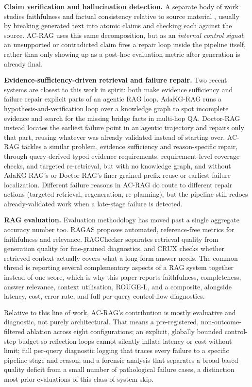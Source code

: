 \documentclass[conference]{IEEEtran}
\begin{document}
\textbf{Claim verification and hallucination detection.} A separate body of work
studies faithfulness and factual consistency relative to source material
\cite{maynez2020faithfulness,kryscinski2020factcc,pagnoni2021frank}, usually by
breaking generated text into atomic claims and checking each against the source.
AC-RAG uses this same decomposition, but as an \emph{internal control signal}: an
unsupported or contradicted claim fires a repair loop inside the pipeline itself,
rather than only showing up as a post-hoc evaluation metric after generation is
already final.

\textbf{Evidence-sufficiency-driven retrieval and failure repair.} Two recent systems
are closest to this work in spirit: both make evidence sufficiency and failure repair
explicit parts of an agentic RAG loop. AdaKG-RAG \cite{yuan2026adakg} runs a
hypothesis-and-verification loop over a knowledge graph to spot incomplete evidence and
search for the missing bridge facts in multi-hop QA. Doctor-RAG \cite{jiao2026doctorrag}
instead locates the earliest failure point in an agentic trajectory and repairs only
that part, reusing whatever was already validated instead of starting over. AC-RAG
tackles a similar problem, evidence sufficiency and reason-specific repair, through
query-derived typed evidence requirements, requirement-level coverage checks, and
targeted re-retrieval, but with no knowledge graph, and without AdaKG-RAG's or
Doctor-RAG's finer-grained prefix reuse or earliest-failure localization. Different
failure reasons in AC-RAG do route to different repair actions (targeted retrieval,
regeneration, re-planning), but the pipeline still redoes already-validated work when a
late-stage failure is detected.

\textbf{RAG evaluation.} Evaluation methodology has moved past a single aggregate
accuracy number too. RAGAS \cite{es2024ragas} proposes automated, reference-free
metrics for faithfulness and relevance. RAGChecker \cite{ru2024ragchecker} separates
retrieval quality from generation quality for fine-grained diagnostics, and CRUX
\cite{ju2025crux} checks whether retrieved context actually covers what a long-form
answer needs. The common thread is reporting several complementary aspects of a RAG
system together instead of one score, which is why this paper reports faithfulness,
completeness, answer relevance, context utilisation, ROUGE-L, and a composite,
alongside latency, cost, error rate, and full per-query control-flow diagnostics.

Relative to this line of work, AC-RAG's contribution is mostly evaluative and
diagnostic, not purely architectural. That means a pre-registered, non-outcome-filtered
ablation across eight configurations; an explicit, globally bounded control-step
budget so reflection loops cannot silently inflate latency or cost without limit; full
per-query diagnostic logging that traces every failure to a specific pipeline stage and
reason; and a forensic analysis that separates a broad-based quality deficit from a
small number of pathological failure cases, a distinction most prior evaluations of
this class of system skip.
\end{document}
